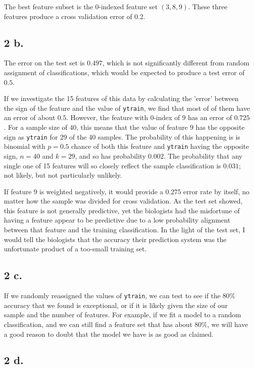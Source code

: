 \documentclass{article}
\begin{document}
The best feature subset is the 0-indexed feature set $(3, 8, 9)$. These three features produce a cross validation error of 0.2.

\subsection*{2 b.}
The error on the test set is $0.497$, which is not significantly different from random assignment of classifications, which would be expected to produce a test error of $0.5$. 

If we investigate the 15 features of this data by calculating the 'error' between the sign of the feature and the value of \texttt{ytrain}, we find that most of of them have an error of about $0.5$. However, the feature with 0-index of $9$ has an error of $0.725$. For a sample size of 40, this means that the value of feature $9$ has the opposite sign as \texttt{ytrain} for 29 of the 40 samples. The probability of this happening is is binomial with $p=0.5$ chance of both this feature and \texttt{ytrain} having the opposite sign, $n=40$ and $k=29$, and so has probability $0.002$. The probability that any single one of 15 features will so closely reflect the sample classification is $0.031$; not likely, but not particularly unlikely. 

If feature $9$ is weighted negatively, it would provide a $0.275$ error rate by itself, no matter how the sample was divided for cross validation. As the test set showed, this feature is not generally predictive, yet the biologists had the misfortune of having a feature appear to be predictive due to a low probability alignment between that feature and the training classification. In the light of the test set, I would tell the biologists that the accuracy their prediction system was the unfortunate product of a too-small training set. 

\subsection*{2 c.}

If we randomly reassigned the values of \texttt{ytrain}, we can test to see if the $80\%$ accuracy that we found is exceptional, or if it is likely given the size of our sample and the number of features. For example, if we fit a model to a random classification, and we can still find a feature set that has about $80\%$, we will have a good reason to doubt that the model we have is as good as claimed. 

\subsection*{2 d.}
\end{document}
